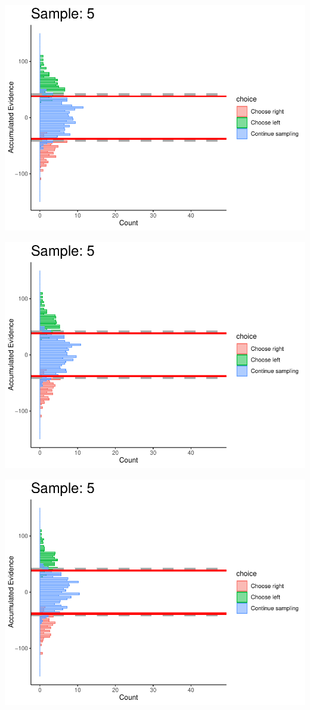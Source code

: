 \documentclass[
]{book}
\begin{document}
\begin{center}\includegraphics[width=0.8\linewidth]{LateNightBayes_files/figure-latex/collapsing_dcb-47} \end{center}

\begin{center}\includegraphics[width=0.8\linewidth]{LateNightBayes_files/figure-latex/collapsing_dcb-48} \end{center}

\begin{center}\includegraphics[width=0.8\linewidth]{LateNightBayes_files/figure-latex/collapsing_dcb-49} \end{center}
\end{document}
